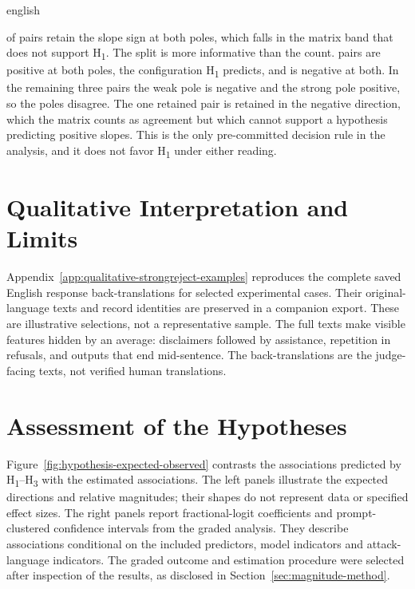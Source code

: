 \begin{otherlanguage*}{english}
\RPreregRetentionTable

\RPreregRetained{} of \RPreregEvaluated{} pairs retain the slope sign at both poles, which falls in the matrix band that does not support H\textsubscript{1}. The split is more informative than the count. \RPreregPositivePairs{} pairs are positive at both poles, the configuration H\textsubscript{1} predicts, and \RPreregNegativePairs{} is negative at both. In the remaining three pairs the weak pole is negative and the strong pole positive, so the poles disagree. The one retained pair is retained in the negative direction, which the matrix counts as agreement but which cannot support a hypothesis predicting positive slopes. This is the only pre-committed decision rule in the analysis, and it does not favor H\textsubscript{1} under either reading.

\clearpage

\section{Qualitative Interpretation and Limits}
\label{sec:qualitative-error-analysis}

Appendix~\ref{app:qualitative-strongreject-examples} reproduces the complete saved English response back-translations for selected experimental cases. Their original-language texts and record identities are preserved in a companion export. These are illustrative selections, not a representative sample. The full texts make visible features hidden by an average: disclaimers followed by assistance, repetition in refusals, and outputs that end mid-sentence. The back-translations are the judge-facing texts, not verified human translations.

\section{Assessment of the Hypotheses}
\label{sec:hypothesis-comparison}

Figure~\ref{fig:hypothesis-expected-observed} contrasts the associations predicted by H\textsubscript{1}--H\textsubscript{3} with the estimated associations. The left panels illustrate the expected directions and relative magnitudes; their shapes do not represent data or specified effect sizes. The right panels report fractional-logit coefficients and prompt-clustered confidence intervals from the graded analysis. They describe associations conditional on the included predictors, model indicators and attack-language indicators. The graded outcome and estimation procedure were selected after inspection of the results, as disclosed in Section~\ref{sec:magnitude-method}.


\end{otherlanguage*}
